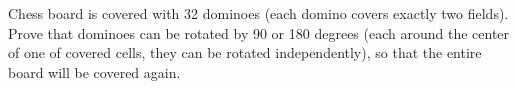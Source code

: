 \problem
Chess board is covered with 32 dominoes (each domino covers exactly two
fields).
Prove that dominoes can be rotated by 90 or 180 degrees (each around the center
of one of covered cells, they can be rotated independently), so that the entire
board will be covered again.

\solution

\endproblem
